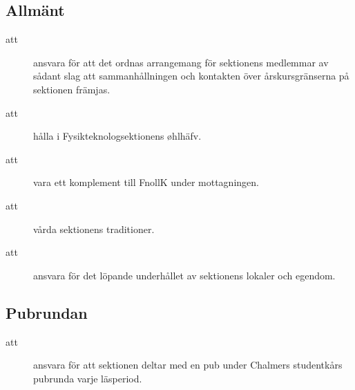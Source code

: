 \documentclass[a4paper]{article}
\begin{document}
\begin{foreningenv}{\forening{}}
    \subsection{Allmänt}
    \begin{description}
          \item[att] ansvara för att det ordnas arrangemang för sektionens medlemmar av sådant slag att sammanhållningen och kontakten över årskursgränserna på sektionen främjas.
          \item[att] hålla i Fysikteknologsektionens øhlhäfv.
          \item[att] vara ett komplement till FnollK under mottagningen.
          \item[att] vårda sektionens traditioner.
          \item[att] ansvara för det löpande underhållet av sektionens lokaler och egendom.
    \end{description}
    
    
    \subsection{Pubrundan}
    \begin{description}
        \item[att] ansvara för att sektionen deltar med en pub under Chalmers studentkårs pubrunda varje läsperiod.
    \end{description}
    

\end{foreningenv}
\end{document}
